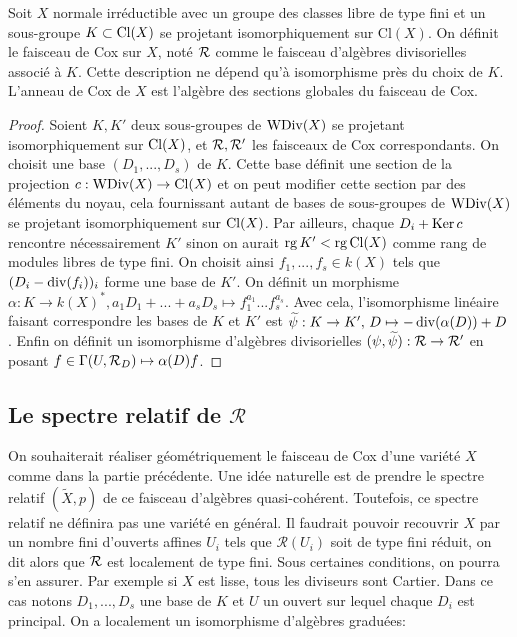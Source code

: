 \begin{cons}
Soit $X$ normale irréductible avec un groupe des classes libre de type fini et un sous-groupe $K\subset \operatorname{Cl}(X)$ se projetant isomorphiquement sur Cl$(X)$. On définit le faisceau de Cox sur $X$, noté $\mathcal{R}$ comme le faisceau d'algèbres divisorielles associé à $K$. Cette description ne dépend qu'à isomorphisme près du choix de $K$. L'anneau de Cox de $X$ est l'algèbre des sections globales du faisceau de Cox. 
\end{cons}
\begin{proof}
Soient $K,K'$ deux sous-groupes de $\operatorname{WDiv}(X)$ se projetant isomorphiquement sur $\operatorname{Cl}(X)$, et $\mathcal{R},\mathcal{R}'$ les faisceaux de Cox correspondants. On choisit une base $(D_1,...,D_s)$ de $K$. Cette base définit une section de la projection $c:\operatorname{WDiv}(X)\rightarrow \operatorname{Cl}(X)$ et on peut modifier cette section par des éléments du noyau, cela fournissant autant de bases de sous-groupes de $\operatorname{WDiv}(X)$ se projetant isomorphiquement sur $\operatorname{Cl}(X)$. Par ailleurs, chaque $D_i+\operatorname{Ker} c$ rencontre nécessairement $K'$ sinon on aurait $\operatorname{rg} K' < \operatorname{rg} \operatorname{Cl}(X)$ comme rang de modules libres de type fini. On choisit ainsi $f_1,...,f_s\in k(X)$ tels que $(D_i-\operatorname{div}(f_i))_i$ forme une base de $K'$. On définit un morphisme $\alpha:K\rightarrow k(X)^*, a_1D_1+...+a_sD_s\mapsto f_1^{a_1}...f_s^{a_s}$. Avec cela, l'isomorphisme linéaire faisant correspondre les bases de $K$ et $K'$ est $\widetilde{\psi}:K\rightarrow K',\, D\mapsto -\operatorname{div}(\alpha(D))+D$. Enfin on définit un isomorphisme d'algèbres divisorielles $(\psi, \widetilde{\psi}): \mathcal{R}\rightarrow\mathcal{R}'$ en posant $f\in \Gamma(U, \mathcal{R}_D)\mapsto \alpha(D)f$.
\end{proof}



\subsection{Le spectre relatif de $\mathcal{R}$}

On souhaiterait réaliser géométriquement le faisceau de Cox d'une variété $X$ comme dans la partie précédente. Une idée naturelle est de prendre le spectre relatif $(\widetilde{X}, p)$ de ce faisceau d'algèbres quasi-cohérent. Toutefois, ce spectre relatif ne définira pas une variété en général. Il faudrait pouvoir recouvrir $X$ par un nombre fini d'ouverts affines $U_i$ tels que $\mathcal{R}(U_i)$ soit de type fini réduit, on dit alors que $\mathcal{R}$ est localement de type fini. Sous certaines conditions, on pourra s'en assurer. Par exemple si $X$ est lisse, tous les diviseurs sont Cartier. Dans ce cas notons $D_1,...,D_s$ une base de $K$ et $U$ un ouvert sur lequel chaque $D_i$ est principal. On a localement un isomorphisme d'algèbres graduées:

